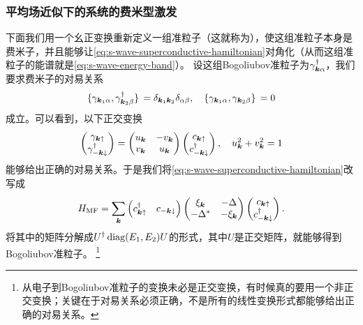 
\subsubsection{平均场近似下的系统的费米型激发}

下面我们用一个幺正变换重新定义一组准粒子（这就称为），使这组准粒子本身是费米子，并且能够让\eqref{eq:s-wave-superconductive-hamiltonian}对角化（从而这组准粒子的能谱就是\eqref{eq:s-wave-energy-band}）。
设这组Bogoliubov准粒子为$\gamma^\dagger_{\vb*{k} \alpha}$，我们要求费米子的对易关系
\begin{equation}
    \acomm*{{\gamma}_{\vb*{k}_1 \alpha}}{{\gamma}^\dagger_{\vb*{k}_2 \beta}} = \delta_{\vb*{k}_1 \vb*{k}_2} \delta_{\alpha \beta}, \quad \acomm*{{\gamma}_{\vb*{k}_1 \alpha}}{{\gamma}_{\vb*{k}_2 \beta}} = 0
\end{equation}
成立。可以看到，以下正交变换
\begin{equation}
    \pmqty{{\gamma}_{\vb*{k} \uparrow} \\ {\gamma}^\dagger_{-\vb*{k} \downarrow}} = \pmqty{u_{\vb*{k}} & -v_{\vb*{k}} \\ v_{\vb*{k}} & u_{\vb*{k}}} \pmqty{{c}_{\vb*{k} \uparrow} \\ {c}^\dagger_{-\vb*{k} \downarrow}},
    \quad u_{\vb*{k}}^2 + v_{\vb*{k}}^2 = 1
\end{equation}
能够给出正确的对易关系。于是我们将\eqref{eq:s-wave-superconductive-hamiltonian}改写成
\begin{equation}
    H_\text{MF} = \sum_{\vb*{k}} \pmqty{c^\dagger_{\vb*{k} \uparrow} & c_{- \vb*{k} \downarrow}} \pmqty{ \xi_{\vb*{k}} & - \Delta \\ - \Delta^* & - \xi_{\vb*{k}} } \pmqty{c_{\vb*{k} \uparrow} \\ c^\dagger_{- \vb*{k} \downarrow}}.
    \label{eq:superconductivity-mf-matrix}
\end{equation}
将其中的矩阵分解成$U^\dagger \operatorname{diag}(E_1, E_2) U$的形式，其中$U$是正交矩阵，就能够得到Bogoliubov准粒子。%
\footnote{从电子到Bogoliubov准粒子的变换未必是正交变换，有时候真的要用一个非正交变换；关键在于对易关系必须正确，不是所有的线性变换形式都能够给出正确的对易关系。}%

